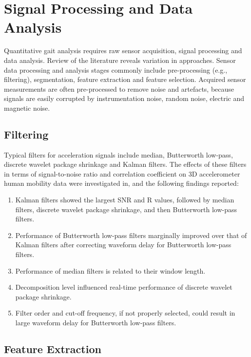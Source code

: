 \documentclass[11pt, oneside]{report}
\begin{document}
\section{Signal Processing and Data Analysis}

Quantitative gait analysis requires raw sensor acquisition, signal processing and data analysis. Review of the literature reveals variation in approaches. Sensor data processing and analysis stages commonly include pre-processing (e.g., filtering), segmentation, feature extraction and feature selection\cite{Khusainov2013}. Acquired sensor measurements are often pre-processed to remove noise and artefacts, because signals are easily corrupted by instrumentation noise, random noise, electric and magnetic noise\cite{Khusainov2013}.

\subsection{Filtering}

Typical filters for acceleration signals include median, Butterworth low-pass, discrete wavelet package shrinkage and Kalman filters\cite{Wang2011}. The effects of these filters in terms of signal-to-noise ratio and correlation coefficient on 3D accelerometer human mobility data were investigated in\cite{Wang2011}, and the following findings reported:

\begin{enumerate}
  \item Kalman filters showed the largest SNR and R values, followed by median filters, discrete wavelet package shrinkage, and then Butterworth low-pass filters.
  \item Performance of Butterworth low-pass filters marginally improved over that of Kalman filters after correcting waveform delay for Butterworth low-pass filters.
  \item Performance of median filters is related to their window length.
  \item Decomposition level influenced real-time performance of discrete wavelet package shrinkage.
  \item Filter order and cut-off frequency, if not properly selected, could result in large waveform delay for Butterworth low-pass filters.
\end{enumerate}

\subsection{Feature Extraction}
\end{document}
